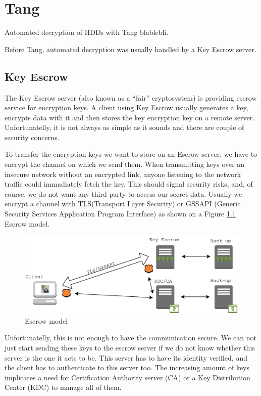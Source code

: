 \chapter{Tang}\label{tang} 

Automated decryption of HDDs with Tang blablebli.

Before Tang, automated decryption was usually handled by a Key Escrow server.

\section{Key Escrow}\label{escrow}

The Key Escrow server (also known as a “fair” cryptosystem) is providing escrow service for encryption keys.
A client using Key Escrow usually generates a key, encrypts data with it and then stores the key encryption key on a remote server.
Unfortunatelly, it is not always as simple as it sounds and there are couple of security concerns.

To transfer the encryption keys we want to store on an Escrow server, we have to encrypt the channel on which we send them.
When transmitting keys over an insecure network without an encrypted link, anyone listening to the network traffic could immadiately fetch the key.
This should signal security risks, and, of course, we do not want any third party to access our secret data.
Usually we encrypt a channel with TLS(Transport Layer Security) or GSSAPI (Generic Security Services Application Program Interface) as shown on a Figure \ref{fig:escrowmodel} Escrow model.
\begin{figure}[h]
    \centering
    \includegraphics[scale=0.7]{figures/EscrowModel.pdf}
    \caption{Escrow model}
    \label{fig:escrowmodel}
\end{figure}
Unfortunatelly, this is not enough to have the communication secure.
We can not just start sending these keys to the escrow server if we do not know whether this server is the one it acts to be.
This server has to have its identity verified, and the client has to authenticate to this server too.
The increasing amount of keys implicates a need for Certification Authority server (CA) or a Key Distribution Center (KDC) to manage all of them.

